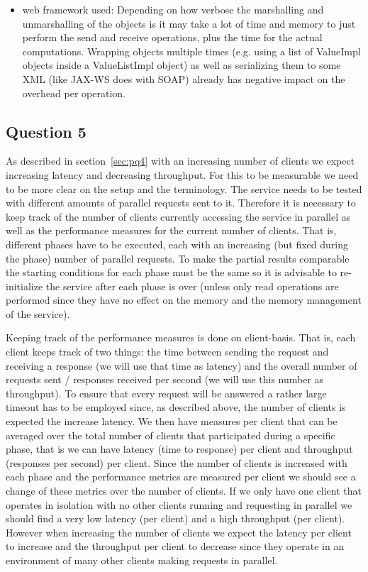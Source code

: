 \documentclass[12pt,a4paper]{article}
\begin{document}
\begin{itemize}
  \item web framework used: Depending on how verbose the marshalling and unmarshalling of the objects is it may take a lot of time and memory to just perform the send and receive operations, plus the time for the actual computations. Wrapping objects multiple times (e.g. using a list of ValueImpl objects inside a ValueListImpl object) as well as serializing them to some XML (like JAX-WS does with SOAP) already has negative impact on the overhead per operation.
\end{itemize}

\subsection*{Question 5}
\label{sec:pq5}
  As described in section~\ref{sec:pq4} with an increasing number of clients we expect increasing latency and decreasing throughput. For this to be measurable we need to be more clear on the setup and the terminology. The service needs to be tested with different amounts of parallel requests sent to it. Therefore it is necessary to keep track of the number of clients currently accessing the service in parallel as well as the performance measures for the current number of clients. That is, different phases have to be executed, each with an increasing (but fixed during the phase) number of parallel requests. To make the partial results comparable the starting conditions for each phase must be the same so it is advisable to re-initialize the service after each phase is over (unless only read operations are performed since they have no effect on the memory and the memory management of the service).
  
  Keeping track of the performance measures is done on client-basis. That is, each client keeps track of two things: the time between sending the request and receiving a response (we will use that time as latency) and the overall number of requests sent / responses received per second (we will use this number as throughput). To ensure that every request will be answered a rather large timeout has to be employed since, as described above, the number of clients is expected the increase latency. We then have measures per client that can be averaged over the total number of clients that participated during a specific phase, that is we can have latency (time to response) per client and throughput (responses per second) per client. Since the number of clients is increased with each phase and the performance metrics are measured per client we should see a change of these metrics over the number of clients. If we only have one client that operates in isolation with no other clients running and requesting in parallel we should find a very low latency (per client) and a high throughput (per client). However when increasing the number of clients we expect the latency per client to increase and the throughput per client to decrease since they operate in an environment of many other clients making requests in parallel.
  
\end{document}
